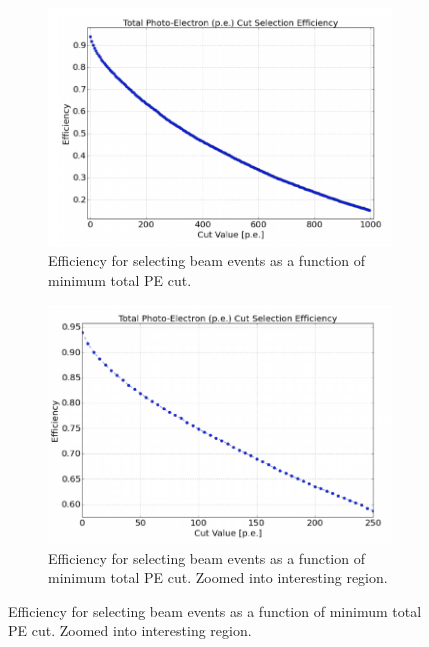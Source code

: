 \begin{figure}[htp!]
\centering
	\begin{subfigure}[b]{.4\textwidth}
	\includegraphics[width=\textwidth]{figs/totalpecut.png}
	\caption{Efficiency for selecting beam events as a function of minimum total PE cut.}
	\label{fig:totalpe}
	\end{subfigure}
	\quad
	\begin{subfigure}[b]{.4\textwidth}
	\includegraphics[width=\textwidth]{figs/totalpe_zoomed.png}
	\caption{Efficiency for selecting beam events as a function of minimum total PE cut. Zoomed into interesting region.}
	\label{fig:totalpe_zoomed}
	\end{subfigure}
	\quad
\label{fig:PE}
\end{figure}
